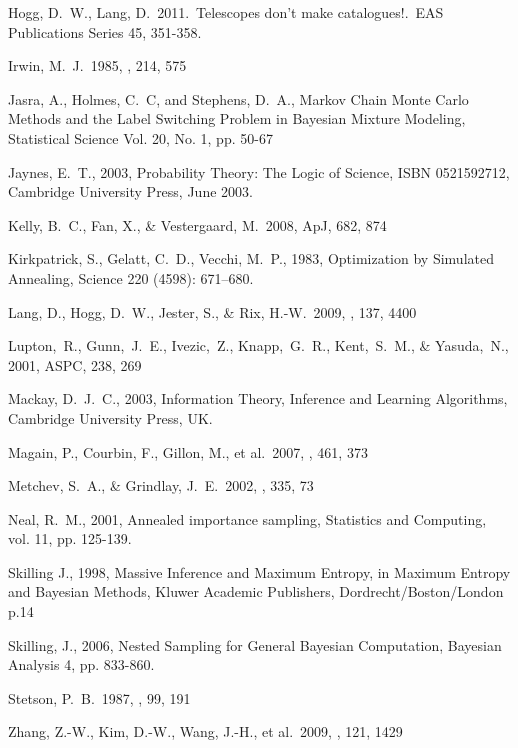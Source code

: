 \documentclass[12pt, preprint]{aastex}
\begin{document}
\begin{thebibliography}{99}
 Hogg, D.~W., Lang, D.\
2011.\ Telescopes don't make catalogues!.\ EAS Publications Series 45,
351-358.

 Irwin, M.~J.\ 1985, \mnras, 214,
575

 Jasra, A., Holmes, C.~C, and
Stephens, D.~A., Markov Chain Monte Carlo Methods and the Label Switching
Problem in Bayesian Mixture Modeling, Statistical Science
Vol. 20, No. 1, pp. 50-67

 Jaynes, E.~T., 2003, Probability Theory: The
Logic of Science, ISBN 0521592712, Cambridge University Press, June 2003.

 Kelly, B.~C., Fan, X.,
\& Vestergaard, M.\ 2008, ApJ, 682, 874

Kirkpatrick, S., Gelatt, C.~D., Vecchi, M.~P., 1983,
Optimization by Simulated Annealing, Science 220 (4598): 671–680.

 Lang, D., Hogg, D.~W., 
Jester, S., \& Rix, H.-W.\ 2009, \aj, 137, 4400 

Lupton,~R., Gunn,~J.~E., Ivezic,~Z., Knapp,~G.~R., Kent,~S.~M., \& Yasuda,~N., 2001, ASPC, 238, 269

 Mackay, D.~J.~C., 2003, Information Theory,
Inference and Learning Algorithms, Cambridge University Press, UK.

 Magain, P., Courbin, F., Gillon, M., et al.\ 2007, \aap, 461, 373 

 Metchev, S.~A., \& Grindlay, J.~E.\ 2002, \mnras, 335, 73 

 Neal, R.~M., 2001, 
Annealed importance sampling, Statistics and Computing, vol. 11, pp. 125-139.

Skilling J., 1998, Massive Inference and Maximum Entropy, in Maximum Entropy
and Bayesian Methods, Kluwer Academic Publishers, Dordrecht/Boston/London p.14

 Skilling, J., 2006, Nested Sampling for General Bayesian Computation, Bayesian Analysis 4, pp. 833-860.

 Stetson, P.~B.\ 1987, \pasp,
99, 191

 Zhang, Z.-W., Kim, D.-W., 
Wang, J.-H., et al.\ 2009, \pasp, 121, 1429 
\end{thebibliography}
\end{document}
